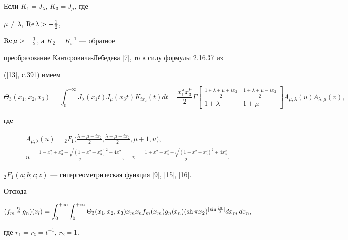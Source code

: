 \begin{exam}


Если $K_1=J_\lambda$, $K_3=J_\mu$, где


$\mu\ne\lambda$, $\operatorname{Re}\lambda>-\frac{1}{2}$,


$\operatorname{Re}\mu>-\frac{1}{2}$, а $K_2=K^{-1}_{i\tau}$ --- обратное


преобразование Канторовича-Лебедева [7], то в силу формулы 2.16.37 из


([13], с.391) имеем


$$


\Theta_3(x_1,x_2,x_3)=\int^{+\infty}_0 J_\lambda(x_1t)J_\mu(x_3t)


K_{ix_2}(t)dt=\frac{x^\lambda_1x^\mu_3}{2}\Gamma


\begin{bmatrix}


\frac{1+\lambda+\mu+ix_2}{2} &


\frac{1+\lambda+\mu-ix_2}{2} \\


1+\lambda & 1+\mu


\end{bmatrix}


A_{\mu,\lambda}(u)A_{\lambda,\mu}(v),


$$


где


\begin{gather*}


A_{\mu,\lambda}(u)= {}_2F_1\biggl(


\frac{\lambda+\mu+ix_2}{2}, \frac{\lambda+\mu-ix_2}{2},


\mu+1,u\biggr),\\


u=


\frac{1-x^2_1+x^2_3-\sqrt{(1-x^2_1+x^2_3)^2+4x^2_1}}


{2}, \quad v=


\frac{1+x^2_1-x^2_3-\sqrt{(1+x^2_1-x^2_3)^2+4x^2_3}}


{2},


\end{gather*}


${}_2F_1(a;b;c;z)$ --- гипергеометрическая функция [9], [15], [16].


Отсюда


$$


(f_m\up{r_l}{}g_n)(x_l)=\int^{+\infty}_0 \int^{+\infty}_0


\Theta_3(x_1,x_2,x_3)x_mx_nf_m(x_m)g_n(x_n)


(\sh\pi x_2)^{|\sin\frac{l\pi}{2}|}dx_m\,dx_n,


$$


где $r_1=r_3=t^{-1}$, $r_2=1$.


\end{exam}






